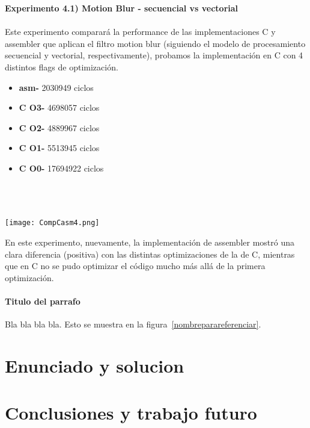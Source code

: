 \documentclass[a4paper]{article}
\begin{document}
\newpage

\textbf{Experimento 4.1) Motion Blur - secuencial vs vectorial}\\ \\

Este experimento comparar\'{a} la performance de las implementaciones C y assembler que aplican el filtro motion blur (siguiendo el modelo de procesamiento secuencial y vectorial, respectivamente), probamos la implementaci\'{o}n en C con 4 distintos flags de optimizaci\'{o}n.

\begin{itemize}

\item \textbf{asm-}  2030949 ciclos
\item \textbf{C O3-} 4698057 ciclos\\
\item \textbf{C O2-} 4889967 ciclos\\
\item \textbf{C O1-} 5513945 ciclos\\
\item \textbf{C O0-} 17694922 ciclos\\\\ \\ \\

\end{itemize}

\texttt{[image: CompCasm4.png]}

En este experimento, nuevamente, la implementaci\'{o}n de assembler mostr\'{o} una clara diferencia (positiva) con las distintas optimizaciones de la de C, mientras que en C no se pudo optimizar el c\'{o}digo mucho m\'{a}s all\'{a} de la primera optimizaci\'{o}n.

\newpage


\paragraph{\textbf{Titulo del parrafo} } Bla bla bla bla.
Esto se muestra en la figura~\ref{nombreparareferenciar}.



\section{Enunciado y solucion} 


\section{Conclusiones y trabajo futuro}
\end{document}

